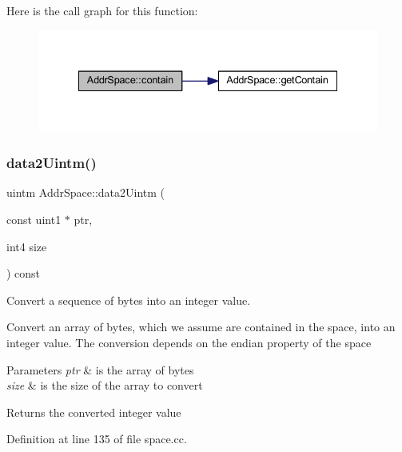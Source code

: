Here is the call graph for this function\+:
\nopagebreak
\begin{figure}[H]
\begin{center}
\leavevmode
\includegraphics[width=335pt]{class_addr_space_a029e10332bf92db61ae25a456c994dd6_cgraph}
\end{center}
\end{figure}
\mbox{\label{class_addr_space_abc38c574b8b642960723ad1c50793c34}} 
\subsubsection{\texorpdfstring{data2Uintm()}{data2Uintm()}}
{\footnotesize\ttfamily uintm Addr\+Space\+::data2\+Uintm (\begin{DoxyParamCaption}\item[{const uint1 $\ast$}]{ptr,  }\item[{int4}]{size }\end{DoxyParamCaption}) const}



Convert a sequence of bytes into an integer value. 

Convert an array of bytes, which we assume are contained in the space, into an integer value. The conversion depends on the endian property of the space 
\begin{DoxyParams}{Parameters}
{\em ptr} & is the array of bytes \\
\hline
{\em size} & is the size of the array to convert \\
\hline
\end{DoxyParams}
\begin{DoxyReturn}{Returns}
the converted integer value 
\end{DoxyReturn}


Definition at line 135 of file space.\+cc.

\mbox{\label{class_addr_space_ad21df4bc27001b5bb1f98fdff8e3decc}} 
